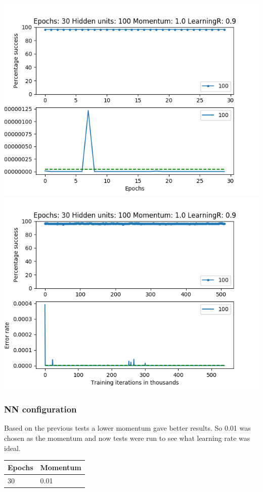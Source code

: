 \documentclass[11pt]{article}
\makeatletter
\def\maxwidth{\ifdim\Gin@nat@width>\linewidth\linewidth
    \else\Gin@nat@width\fi}
\let\Oldincludegraphics\includegraphics
\renewcommand{\includegraphics}[1]{\Oldincludegraphics[width=.8\maxwidth]{#1}}
\makeatother
\begin{document}
\includegraphics{Experiment1/E1_NN_Epoch_Momentum_1.0_30Epochs_100_LR_0.9_Hiddenunits.png}
\includegraphics{Experiment1/E1_NN_Training_Momentum_1.0_30Epochs_100_LR_0.9_Hiddenunits.png}

\hypertarget{nn-configuration-1}{%
\subsubsection{NN configuration}\label{nn-configuration-1}}

Based on the previous tests a lower momentum gave better results. So
0.01 was chosen as the momentum and now tests were run to see what
learning rate was ideal.

\begin{longtable}[]{@{}ll@{}}
\toprule
Epochs & Momentum\tabularnewline
\midrule
\endhead
30 & 0.01\tabularnewline
\bottomrule
\end{longtable}
\end{document}
